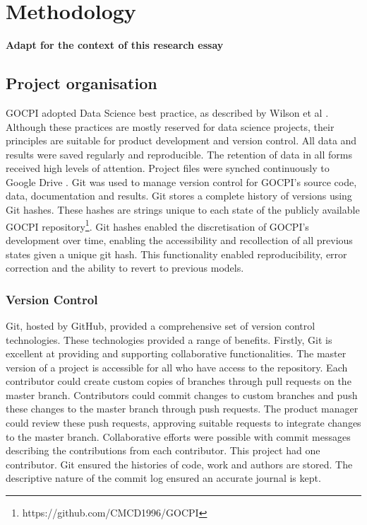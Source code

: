 \documentclass[12pt]{article}
\begin{document}
\section{Methodology}
\textbf{Adapt for the context of this research essay}
\subsection{Project organisation}
GOCPI adopted Data Science best practice, as described by Wilson et al \cite{J:10}. Although these practices are
mostly reserved for data science projects, their principles are suitable for product development and version control. All data and
results were saved regularly and reproducible. The retention of data in all forms received high levels of attention. Project files were synched
continuously to Google Drive \cite{Google_Drive}. Git \cite{Git} was used to manage version control for GOCPI's source code, data, documentation and results.
Git stores a complete history of versions using Git hashes. These hashes are strings unique to each state of the
publicly available GOCPI repository\footnote[1]{https://github.com/CMCD1996/GOCPI}. Git hashes enabled the discretisation of GOCPI's development over time,
enabling the accessibility and recollection of all previous states given a unique git hash. This functionality
enabled reproducibility, error correction and the ability to revert to previous models.

\subsubsection{Version Control}\label{Version Control}
Git, hosted by GitHub, provided a comprehensive set of version control technologies. These technologies provided a range of benefits.
Firstly, Git is excellent at providing and supporting collaborative functionalities. The master version of a project is accessible for all
who have access to the repository. Each contributor could create custom copies of branches through pull requests on the master branch. Contributors
could commit changes to custom branches and push these changes to the master branch through push requests. The product manager could review these push requests,
approving suitable requests to integrate changes to the master branch. Collaborative efforts were possible with
commit messages describing the contributions from each contributor. This project had one contributor. Git ensured the histories of code, work and authors are stored.
The descriptive nature of the commit log ensured an accurate journal is kept.
\end{document}
